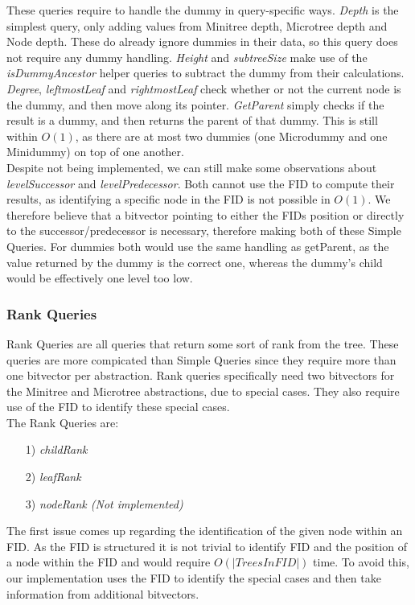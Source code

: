 \documentclass{article}
\begin{document}
These queries require to handle the dummy in query-specific ways. \textit{Depth} is the simplest query, only adding values from Minitree depth, Microtree depth and Node depth. These do already ignore dummies in their data, so this query does not require any dummy handling. \textit{Height} and \textit{subtreeSize} make use of the \textit{isDummyAncestor} helper queries to subtract the dummy from their calculations. \textit{Degree}, \textit{leftmostLeaf} and \textit{rightmostLeaf} check whether or not the current node is the dummy, and then move along its pointer. \textit{GetParent} simply checks if the result is a dummy, and then returns the parent of that dummy. This is still within $O(1)$, as there are at most two dummies (one Microdummy and one Minidummy) on top of one another.\\
Despite not being implemented, we can still make some observations about 
\textit{levelSuccessor} and \textit{levelPredecessor}. Both cannot use the FID to compute their results, as identifying a specific node in the FID is not possible in $O(1)$. We therefore believe that a bitvector pointing to either the FIDs position or directly to the successor/predecessor is necessary, therefore making both of these Simple Queries. For dummies both would use the same handling as getParent, as the value returned by the dummy is the correct one, whereas the dummy's child would be effectively one level too low.

\subsubsection{Rank Queries}
Rank Queries are all queries that return some sort of rank from the tree. These queries are more compicated than Simple Queries since they require more than one bitvector per abstraction.
Rank queries specifically need two bitvectors for the Minitree and Microtree abstractions, due to special cases.
They also require use of the FID to identify these special cases.\\
The Rank Queries are:\\
\begin{itemize}
	\item[1)] \textit{childRank}
	\item[2)] \textit{leafRank}
	\item[3)] \textit{nodeRank (Not implemented)}
\end{itemize}
The first issue comes up regarding the identification of the given node within an FID. As the FID is structured it is not trivial to identify FID and the position of a node within the FID and would require $O(|TreesInFID|)$ time. To avoid this, our implementation uses the FID to identify the special cases and then take information from additional bitvectors.
\end{document}
